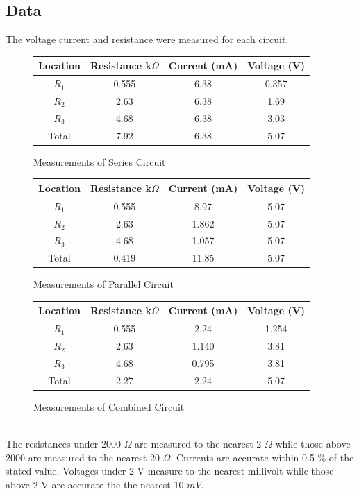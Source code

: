 \documentclass[11pt]{article}
\begin{document}
\subsection{Data}
The voltage current and resistance were measured for each circuit.
\begin{figure}[h]
	\centering
	\caption{Measurements of Series Circuit} 
	\begin{tabular}{|c|c|c|c| }
		\hline
		Location & Resistance  k\(\Omega\) & Current (mA) & Voltage (V) \\ \hline
		\(R_1\) & 0.555 & 6.38 & 0.357 \\
		\(R_2\) & 2.63 & 6.38 & 1.69 \\
		\(R_3\) & 4.68 & 6.38 & 3.03 \\
		Total & 7.92 & 6.38 & 5.07 \\
		\hline
	\end{tabular}

\end{figure}
\begin{figure}[h]
	\centering
	\caption{Measurements of Parallel Circuit} 
	\begin{tabular}{|c|c|c|c| }
		\hline
		Location & Resistance  k\(\Omega\) & Current (mA) & Voltage (V) \\ \hline
		\(R_1\) & 0.555 & 8.97 & 5.07 \\
		\(R_2\) & 2.63 & 1.862 & 5.07 \\
		\(R_3\) & 4.68 & 1.057 & 5.07 \\
		Total & 0.419 & 11.85 & 5.07 \\
		\hline
	\end{tabular}
	
\end{figure}
\begin{figure}[h]
	\centering
	\caption{Measurements of Combined Circuit} 
	\begin{tabular}{|c|c|c|c| }
		\hline
		Location & Resistance  k\(\Omega\) & Current (mA) & Voltage (V) \\ \hline
		\(R_1\) & 0.555 & 2.24 & 1.254 \\
		\(R_2\) & 2.63 & 1.140 & 3.81 \\
		\(R_3\) & 4.68 & 0.795 & 3.81 \\
		Total  & 2.27 & 2.24 & 5.07 \\
		\hline
	\end{tabular}
\end{figure}
\\
The resistances under 2000 \(  \Omega \) are measured to the nearest 2 \( \Omega \) while those above 2000 are measured to the nearest  20 \( \Omega \). Currents are accurate within 0.5 \% of the stated value. Voltages under 2 V measure to the nearest millivolt while those above 2 V are accurate the the nearest 10 \( mV \).
\end{document}
